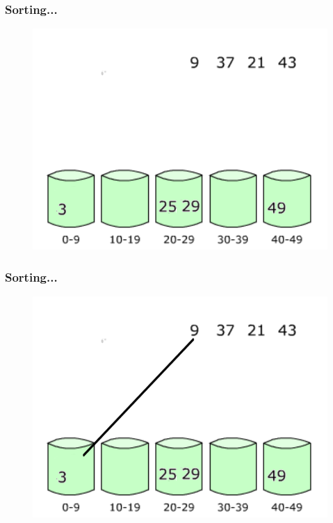 \documentclass[pdf]{beamer}
\begin{document}
\begin{frame}
	\frametitle{Sorting...}
	\begin{figure}
		\includegraphics[scale=.3]{Figure/8.png}
	\end{figure}	
\end{frame}

\begin{frame}
	\frametitle{Sorting...}
	\begin{figure}
		\includegraphics[scale=.3]{Figure/9.png}
	\end{figure}	
\end{frame}
\end{document}
